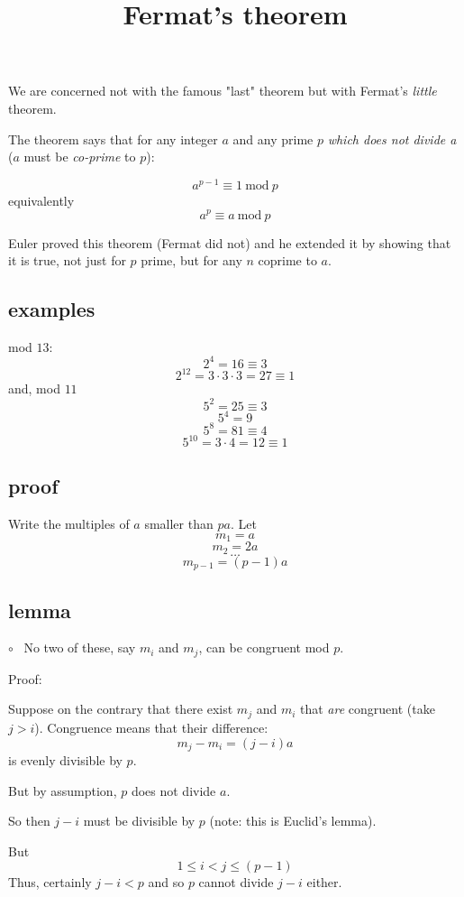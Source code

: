 \documentclass[11pt, oneside]{article}
\title{Fermat's theorem}
\date{}
\begin{document}
\maketitle
\Large


We are concerned not with the famous "last" theorem but with Fermat's \emph{little} theorem.

The theorem says that for any integer $a$ and any prime $p$ \emph{which does not divide a} ($a$ must be \emph{co-prime} to $p$):

\[ a^{p-1} \equiv 1 \ \text{mod} \ p \]
equivalently
\[ a^p \equiv a \ \text{mod} \ p \]

Euler proved this theorem (Fermat did not) and he extended it by showing that it is true, not just for $p$ prime, but for any $n$ coprime to $a$.

\subsection*{examples}

mod $13$:
\[ 2^4 = 16 \equiv 3 \]
\[ 2^{12} = 3 \cdot 3 \cdot 3 = 27 \equiv 1 \]
and, mod $11$
\[ 5^2 = 25 \equiv 3 \]
\[ 5^4 = 9 \]
\[ 5^8 = 81 \equiv 4 \]
\[ 5^{10} = 3 \cdot 4 = 12 \equiv 1 \]

\subsection*{proof}

Write the multiples of $a$ smaller than $pa$.  Let
\[ m_1 = a \]
\[ m_2 = 2a \]
\[ \dots \]
\[ m_{p-1} = (p-1)a  \]

\subsection*{lemma}

$\circ$ \ No two of these, say $m_i$ and $m_j$, can be congruent mod $p$.

Proof:

Suppose on the contrary that there exist $m_j$ and $m_i$ that \emph{are} congruent (take $j > i$).  Congruence means that their difference:
\[ m_j - m_i = (j - i)a \]
is evenly divisible by $p$.  

But by assumption, $p$ does not divide $a$.  

So then $j - i$ must be divisible by $p$ (note:  this is Euclid's lemma).  

But
\[ 1 \le i < j \le (p-1) \] 
Thus, certainly $j - i < p$ and so $p$ cannot divide $j-i$ either.
\end{document}

